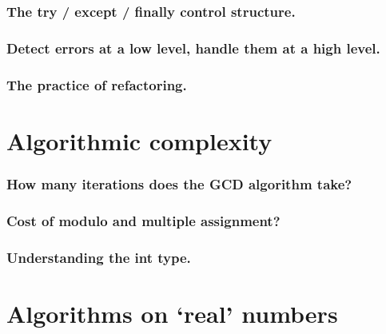 \documentclass{beamer} %
\begin{document}
\begin{frame}
\frametitle{The try / except / finally control structure.}
\end{frame}


\begin{frame}
\frametitle{Detect errors at a low level, handle them at a high level.}
\end{frame}




\begin{frame}
\frametitle{The practice of refactoring.}
\end{frame}

\section{Algorithmic complexity}

\begin{frame}
\frametitle{How many iterations does the GCD algorithm take?}
\end{frame}



\begin{frame}
\frametitle{Cost of modulo and multiple assignment?}
\end{frame}


\begin{frame}
\frametitle{Understanding the int type.}
\end{frame}

\section{Algorithms on `real' numbers}
\end{document}
